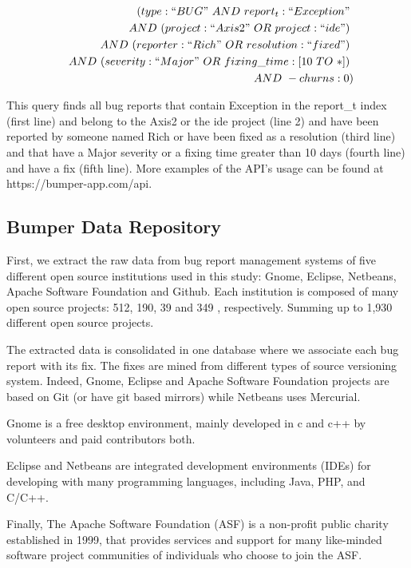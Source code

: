 \documentclass[conference]{IEEEtran}
\begin{document}
\begin{equation*}
\begin{split}
  (type:``BUG"~AND~report_t:``Exception"~\\
~~AND~(project:``Axis2"~OR~project:``ide")~\\
~~AND~(reporter:``Rich"~OR~resolution:``fixed")~\\
~~AND~(severity:``Major"~OR~fixing\_time:[10~TO~*])~\\
~~AND~-churns:0)
\end{split}
\end{equation*}

This query finds all bug reports that contain Exception in the
report\_t index (first line) and belong to the Axis2 or the ide
project (line 2) and have been reported by someone named Rich
or have been fixed as a resolution (third line) and that have a
Major severity or a fixing time greater than 10 days (fourth line)
and have a fix (fifth line).
More examples of the API's usage can
be found at https://bumper-app.com/api.


\subsection{Bumper Data Repository}
\label{sub:Bumper Data Repository}

First, we extract the raw data from bug report management systems of five different open source institutions used in this study: Gnome, Eclipse, Netbeans, Apache Software Foundation and Github.
Each institution is composed of many open source projects: 512, 190, 39 and 349 , respectively. Summing up to 1,930 different open source projects.

The extracted data is consolidated in one database where we associate each bug report with its fix.
The fixes are mined from different types of source versioning system.
Indeed, Gnome, Eclipse and Apache Software Foundation projects are based on Git (or have git based mirrors) while Netbeans uses Mercurial.

Gnome is a free desktop environment, mainly developed in c and c++ by volunteers and paid contributors both.

Eclipse and Netbeans are integrated development environments (IDEs) for developing with many programming languages, including Java, PHP, and C/C++.

Finally, The Apache Software Foundation (ASF) is a non-profit public charity established in 1999, that provides services and support for many like-minded software project communities of individuals who choose to join the ASF.
\end{document}
